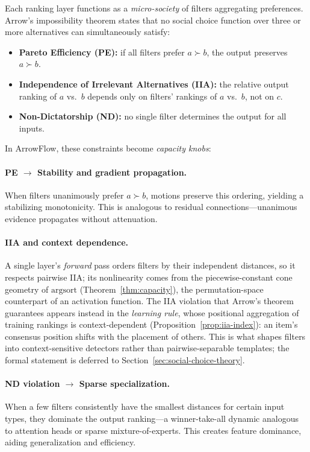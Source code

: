 \documentclass[12pt]{article}
\newcommand{\argsort}{\mathrm{argsort}}
\begin{document}
Each ranking layer functions as a \emph{micro-society} of filters aggregating preferences. Arrow's impossibility theorem states that no social choice function over three or more alternatives can simultaneously satisfy:
\begin{itemize}[leftmargin=2em]
  \item \textbf{Pareto Efficiency (PE):} if all filters prefer $a \succ b$, the output preserves $a \succ b$.
  \item \textbf{Independence of Irrelevant Alternatives (IIA):} the relative output ranking of $a$ vs.\ $b$ depends only on filters' rankings of $a$ vs.\ $b$, not on $c$.
  \item \textbf{Non-Dictatorship (ND):} no single filter determines the output for all inputs.
\end{itemize}

In ArrowFlow, these constraints become \emph{capacity knobs}:

\paragraph{PE $\to$ Stability and gradient propagation.}
When filters unanimously prefer $a \succ b$, motions preserve this ordering, yielding a stabilizing monotonicity. This is analogous to residual connections---unanimous evidence propagates without attenuation.

\paragraph{IIA and context dependence.}
A single layer's \emph{forward} pass orders filters by their independent distances, so it respects pairwise IIA; its nonlinearity comes from the piecewise-constant cone geometry of $\argsort$ (Theorem~\ref{thm:capacity}), the permutation-space counterpart of an activation function. The IIA violation that Arrow's theorem guarantees appears instead in the \emph{learning rule}, whose positional aggregation of training rankings is context-dependent (Proposition~\ref{prop:iia-index}): an item's consensus position shifts with the placement of others. This is what shapes filters into context-sensitive detectors rather than pairwise-separable templates; the formal statement is deferred to Section~\ref{sec:social-choice-theory}.

\paragraph{ND violation $\to$ Sparse specialization.}
When a few filters consistently have the smallest distances for certain input types, they dominate the output ranking---a winner-take-all dynamic analogous to attention heads or sparse mixture-of-experts. This creates feature dominance, aiding generalization and efficiency.
\end{document}
